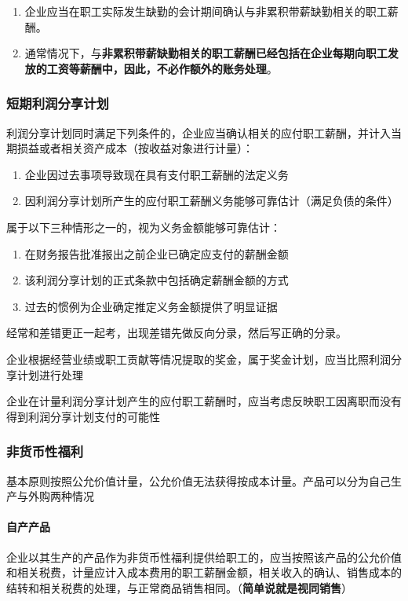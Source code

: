 \documentclass[UTF8,12pt]{ctexart}
\numberwithin{equation}{section} %
\numberwithin{figure}{section}
\numberwithin{table}{section}
\begin{document}
	\begin{enumerate}
		\item 企业应当在职工实际发生缺勤的会计期间确认与非累积带薪缺勤相关的职工薪酬。
		
		\item 通常情况下，与\textbf{非累积带薪缺勤相关的职工薪酬已经包括在企业每期向职工发放的工资等薪酬中，因此，不必作额外的账务处理}。
	\end{enumerate}

	
	\subsubsection{短期利润分享计划}
	利润分享计划同时满足下列条件的，企业应当确认相关的应付职工薪酬，并计入当期损益或者相关资产成本（按收益对象进行计量）：
	\begin{enumerate}
		\item 企业因过去事项导致现在具有支付职工薪酬的法定义务
		
		\item 因利润分享计划所产生的应付职工薪酬义务能够可靠估计（满足负债的条件）
	\end{enumerate}
	
	属于以下三种情形之一的，视为义务金额能够可靠估计：
	\begin{enumerate}
		\item 在财务报告批准报出之前企业已确定应支付的薪酬金额
		
		\item 该利润分享计划的正式条款中包括确定薪酬金额的方式
		
		\item 过去的惯例为企业确定推定义务金额提供了明显证据
	\end{enumerate}

	经常和差错更正一起考，出现差错先做反向分录，然后写正确的分录。
	
	企业根据经营业绩或职工贡献等情况提取的奖金，属于奖金计划，应当比照利润分享计划进行处理
	
	企业在计量利润分享计划产生的应付职工薪酬时，应当考虑反映职工因离职而没有得到利润分享计划支付的可能性
	
	\subsubsection{非货币性福利}
	基本原则按照公允价值计量，公允价值无法获得按成本计量。产品可以分为自己生产与外购两种情况
	
	\paragraph{自产产品}
	企业以其生产的产品作为非货币性福利提供给职工的，应当按照该产品的公允价值和相关税费，计量应计入成本费用的职工薪酬金额，相关收入的确认、销售成本的结转和相关税费的处理，与正常商品销售相同。（\textbf{简单说就是视同销售}）
	
\end{document}
